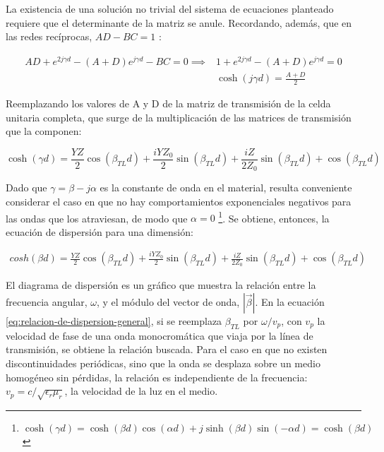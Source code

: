 La existencia de una solución no trivial del sistema de ecuaciones planteado requiere que el determinante de la matriz se anule. Recordando, además, que en las redes recíprocas, $AD-BC=1$ \cite{Pozar:MwEngineering}:

\begin{subequations}
	\begin{align}
		AD + e^{2j \gamma d} - (A+D)e^{j\gamma d}-BC = 0 \implies &1+e^{2j\gamma d}-(A+D)e^{j\gamma d} = 0 \\
		&\cosh (j\gamma d) = \frac{A+D}{2}
	\end{align}
\end{subequations}

Reemplazando los valores de A y D de la matriz de transmisión de la celda unitaria completa, que surge de la multiplicación de las matrices de transmisión que la componen:

\begin{equation}
\cosh (\gamma d) = \frac{Y Z}{2} \cos{\left (\beta_{TL} d \right )} + \frac{i Y Z_{0}}{2} \sin{\left (\beta_{TL} d \right )} + \frac{i Z}{2 Z_{0}} \sin{\left (\beta_{TL} d \right )} + \cos{\left (\beta_{TL} d \right )}
\end{equation}

Dado que $\gamma = \beta -j\alpha$ es la constante de onda en el material, resulta conveniente considerar el caso en que no hay comportamientos exponenciales negativos para las ondas que los atraviesan, de modo que $\alpha=0$ \footnote{$\cosh (\gamma d) = \cosh(\beta d)\cos(\alpha d) + j \sinh(\beta d) \sin(-\alpha d) = \cosh (\beta d)$}. Se obtiene, entonces, la ecuación de dispersión para una dimensión:

\begin{align}
	\label{eq:relacion-de-dispersion-general}
	cosh(\beta d) = \frac{Y Z}{2} \cos{\left (\beta_{TL} d \right )} + \frac{i Y Z_{0}}{2} \sin{\left (\beta_{TL} d \right )} + \frac{i Z}{2 Z_{0}} \sin{\left (\beta_{TL} d \right )} + \cos{\left (\beta_{TL} d \right )}
\end{align}

El diagrama de dispersión es un gráfico que muestra la relación entre la frecuencia angular, $\omega$, y el módulo del vector de onda, $|\vec{\beta}|$. En la ecuación \ref{eq:relacion-de-dispersion-general}, si se reemplaza $\beta_{TL}$ por $\omega/v_p$, con $v_p$ la velocidad de fase de una onda monocromática que viaja por la línea de transmisión, se obtiene la relación buscada. Para el caso en que no existen discontinuidades periódicas, sino que la onda se desplaza sobre un medio homogéneo sin pérdidas, la relación es independiente de la frecuencia: $v_p = c/\sqrt{\epsilon_r \mu_r}$, la velocidad de la luz en el medio.

